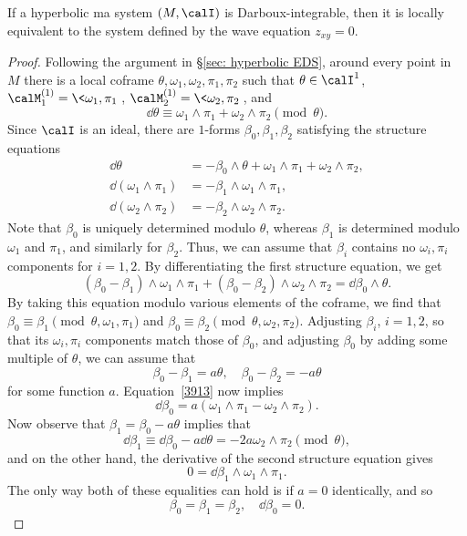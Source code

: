 \begin{prop}
    If a hyperbolic \gls{ma} system $(M,\calI)$ is Darboux-integrable, then it is locally equivalent to the system defined by the wave equation $z_{xy}=0$.
\end{prop}
\begin{proof}
    Following the argument in \S\ref{sec: hyperbolic EDS}, around every point in $M$ there is a local coframe $\theta,\omega_1,\omega_2,\pi_1,\pi_2$ such that $\theta\in\calI^1$, $\calM_1^{(1)}=\<\omega_1,\pi_1\>$, $\calM_2^{(1)}=\<\omega_2,\pi_2\>$, and 
    \[\dd\theta\equiv \omega_1\wedge\pi_1 +\omega_2\wedge\pi_2 \pmod{\theta}.\]
    Since $\calI$ is an ideal, there are $1$-forms $\beta_0,\beta_1,\beta_2$ satisfying the structure equations 
    \begin{align}
        \dd\theta&=-\beta_0\wedge\theta +\omega_1\wedge\pi_1+\omega_2\wedge\pi_2,\\
        \dd(\omega_1\wedge\pi_1)&=-\beta_1\wedge\omega_1\wedge\pi_1,\\
        \dd(\omega_2\wedge\pi_2)&=-\beta_2\wedge \omega_2\wedge\pi_2.
    \end{align}
    Note that $\beta_0$ is uniquely determined modulo $\theta$, whereas $\beta_1$ is determined modulo $\omega_1$ and $\pi_1$, and similarly for $\beta_2$. Thus, we can assume that $\beta_i$ contains no $\omega_i,\pi_i$ components for $i=1,2$. By differentiating the first structure equation, we get 
    \[(\beta_0-\beta_1)\wedge\omega_1\wedge\pi_1+(\beta_0-\beta_2)\wedge\omega_2\wedge\pi_2=\dd\beta_0\wedge\theta.\label{3913}\]
    By taking this equation modulo various elements of the coframe, we find that $\beta_0\equiv \beta_1\pmod{\theta,\omega_1,\pi_1}$ and $\beta_0\equiv \beta_2\pmod{\theta,\omega_2,\pi_2}$. Adjusting $\beta_i$, $i=1,2$, so that its $\omega_i,\pi_i$ components match those of $\beta_0$, and adjusting $\beta_0$ by adding some multiple of $\theta$,
    we can assume that 
    \[\beta_0-\beta_1=a\theta,\quad \beta_0-\beta_2=-a\theta\] 
    for some function $a$. Equation~\ref{3913} now implies 
    \[\dd\beta_0=a(\omega_1\wedge\pi_1-\omega_2\wedge\pi_2).\]
    Now observe that $\beta_1=\beta_0-a\theta$ implies that
    \[\dd \beta_1\equiv \dd\beta_0-a\dd \theta=-2a\omega_2\wedge\pi_2\pmod{\theta},\]
    and on the other hand, the derivative of the second structure equation gives 
    \[0=\dd\beta_1\wedge\omega_1\wedge\pi_1.\]
    The only way both of these equalities can hold is if $a=0$ identically, and so 
    \[\beta_0=\beta_1=\beta_2,\quad \dd\beta_0=0.\]

\end{proof}
